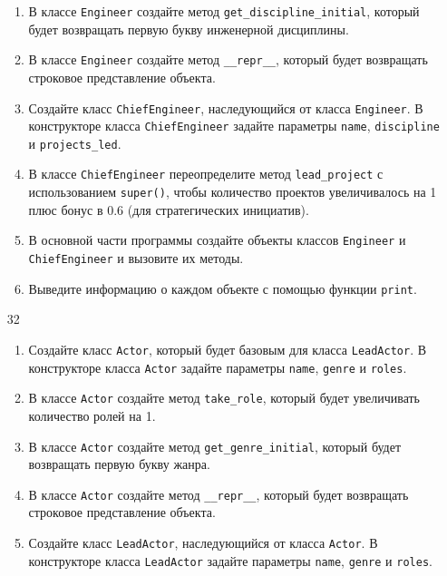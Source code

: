 \begin{enumerate}
\begin{enumerate}[leftmargin=*]
    \item В классе \texttt{Engineer} создайте метод \texttt{get\_discipline\_initial}, который будет возвращать первую букву инженерной дисциплины.
    
    \item В классе \texttt{Engineer} создайте метод \texttt{\_\_repr\_\_}, который будет возвращать строковое представление объекта.
    
    \item Создайте класс \texttt{ChiefEngineer}, наследующийся от класса \texttt{Engineer}. В конструкторе класса \texttt{ChiefEngineer} задайте параметры \texttt{name}, \texttt{discipline} и \texttt{projects\_led}.
    
    \item В классе \texttt{ChiefEngineer} переопределите метод \texttt{lead\_project} с использованием \texttt{super()}, чтобы количество проектов увеличивалось на 1 плюс бонус в 0.6 (для стратегических инициатив).
    
    \item В основной части программы создайте объекты классов \texttt{Engineer} и \texttt{ChiefEngineer} и вызовите их методы.
    
    \item Выведите информацию о каждом объекте с помощью функции \texttt{print}.
\end{enumerate}

\item[32] 
\begin{enumerate}[leftmargin=*]
    \item Создайте класс \texttt{Actor}, который будет базовым для класса \texttt{LeadActor}. В конструкторе класса \texttt{Actor} задайте параметры \texttt{name}, \texttt{genre} и \texttt{roles}.
    
    \item В классе \texttt{Actor} создайте метод \texttt{take\_role}, который будет увеличивать количество ролей на 1.
    
    \item В классе \texttt{Actor} создайте метод \texttt{get\_genre\_initial}, который будет возвращать первую букву жанра.
    
    \item В классе \texttt{Actor} создайте метод \texttt{\_\_repr\_\_}, который будет возвращать строковое представление объекта.
    
    \item Создайте класс \texttt{LeadActor}, наследующийся от класса \texttt{Actor}. В конструкторе класса \texttt{LeadActor} задайте параметры \texttt{name}, \texttt{genre} и \texttt{roles}.
    

\end{enumerate}
\end{enumerate}
